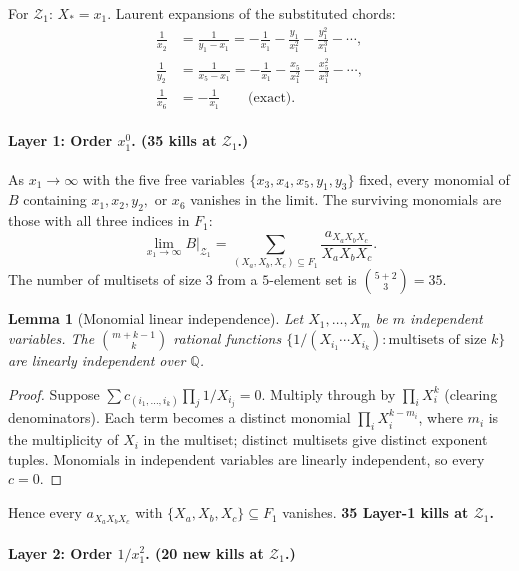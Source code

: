 \documentclass[11pt]{article}
\newcommand{\Z}{\mathcal{Z}}
\newtheorem{lemma}{Lemma}
\theoremstyle{definition}
\begin{document}
For $\Z_1$: $X_* = x_1$. Laurent expansions of the substituted chords:
\begin{align}
\frac{1}{x_2} &= \frac{1}{y_1 - x_1} = -\frac{1}{x_1} - \frac{y_1}{x_1^2} - \frac{y_1^2}{x_1^3} - \cdots,\\
\frac{1}{y_2} &= \frac{1}{x_5 - x_1} = -\frac{1}{x_1} - \frac{x_5}{x_1^2} - \frac{x_5^2}{x_1^3} - \cdots,\\
\frac{1}{x_6} &= -\frac{1}{x_1}\qquad\text{(exact).}
\end{align}

\paragraph{Layer 1: Order $x_1^0$. (35 kills at $\Z_1$.)}

As $x_1\to\infty$ with the five free variables $\{x_3,x_4,x_5,y_1,y_3\}$
fixed, every monomial of $B$ containing $x_1, x_2, y_2,$ or $x_6$ vanishes
in the limit. The surviving monomials are those with all three indices
in $F_1$:
\[
\lim_{x_1\to\infty} B|_{\Z_1} = \sum_{(X_a, X_b, X_c)\subseteq F_1}\frac{a_{X_a X_b X_c}}{X_a X_b X_c}.
\]
The number of multisets of size $3$ from a $5$-element set is
$\binom{5+2}{3} = 35$.

\begin{lemma}[Monomial linear independence]
\label{lem:monomial-indep}
Let $X_1,\ldots,X_m$ be $m$ independent variables. The $\binom{m+k-1}{k}$
rational functions $\{1/(X_{i_1}\cdots X_{i_k}) : \text{multisets of size }k\}$
are linearly independent over $\mathbb{Q}$.
\end{lemma}

\begin{proof}
Suppose $\sum c_{(i_1,\ldots,i_k)}\prod_j 1/X_{i_j} = 0$. Multiply through by
$\prod_i X_i^k$ (clearing denominators). Each term becomes a distinct monomial
$\prod_i X_i^{k-m_i}$, where $m_i$ is the multiplicity of $X_i$ in the
multiset; distinct multisets give distinct exponent tuples. Monomials in
independent variables are linearly independent, so every $c=0$.
\end{proof}

Hence every $a_{X_a X_b X_c}$ with $\{X_a, X_b, X_c\}\subseteq F_1$ vanishes.
\textbf{35 Layer-1 kills at $\Z_1$.}

\paragraph{Layer 2: Order $1/x_1^2$. (20 new kills at $\Z_1$.)}
\end{document}
